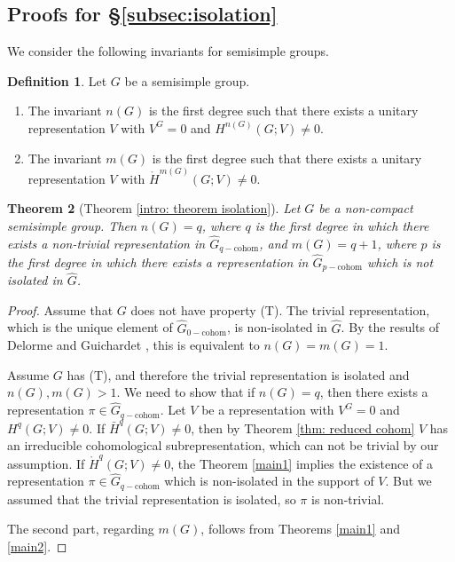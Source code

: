 \documentclass[12pt,reqno]{amsart}
\newtheorem{theorem}{Theorem}[section]
\theoremstyle{definition}
\newtheorem{definition}[theorem]{Definition}
\newcommand{\torH}{\mathring{H}}
\begin{document}
\subsection{Proofs for \S\ref{subsec:isolation}}\label{subsec:isolation proofs}
We consider the following invariants for semisimple groups.
\begin{definition}
    Let $G$ be a semisimple group. 
    \begin{enumerate}
        \item The invariant $n(G)$ is the first degree such that there exists a unitary representation $V$ with $V^G=0$ and $H^{n(G)}(G;V) \ne 0$.
        \item The invariant $m(G)$ is the first degree such that there exists a unitary representation $V$ with $\torH^{m(G)}(G;V) \ne 0$.
    \end{enumerate}
\end{definition}
\begin{theorem}[Theorem \ref{intro: theorem isolation}]\label{thm:isolation}
    Let $G$ be a non-compact semisimple group. Then $n(G)=q$, where $q$ is the first degree in which there exists a non-trivial representation in $\widehat{G}_{q-\mathrm{cohom}}$, 
    and $m(G)=q+1$, where $p$ is the first degree in which there exists a representation in $\widehat{G}_{p-\mathrm{cohom}}$ which is not isolated in $\widehat{G}$.
\end{theorem}
\begin{proof}
     Assume that $G$ does not have property (T). The trivial representation, which is the unique element of $\widehat{G}_\mathrm{0-cohom}$, is non-isolated in $\widehat{G}$. By the results of Delorme \cite[Th\'eor\`em~V.1]{Delorme} and Guichardet \cite{Guichardet72}, this is equivalent to $n(G)=m(G)=1$.
    
    Assume $G$ has (T), and therefore the trivial representation is isolated and $n(G),m(G)>1$.  We need to show that if $n(G)=q$, then there exists a representation $\pi \in \widehat{G}_{q-\mathrm{cohom}}$. Let $V$ be a representation with $V^G=0$ and $H^q(G;V) \ne 0$. If $\bar{H}^q(G;V)\ne 0$, then by Theorem \ref{thm: reduced cohom} $V$ has an irreducible cohomological subrepresentation, which can not be trivial by our assumption. If $\torH^q(G;V) \ne 0$, the Theorem \ref{main1} implies the existence of a representation $\pi \in \widehat{G}_{q-\mathrm{cohom}}$ which is non-isolated in the support of $V$. But we assumed that the trivial representation is isolated, so $\pi$ is non-trivial.
    
    The second part, regarding $m(G)$, follows from Theorems \ref{main1} and \ref{main2}.
\end{proof}
\end{document}
